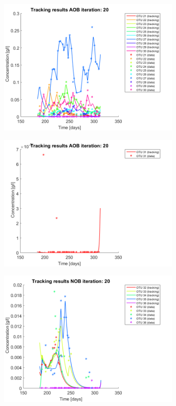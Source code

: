 \documentclass[3p,times]{article}
\begin{document}
\begin{figure}[h]
\begin{subfigure}{0.45 \textwidth}
	\includegraphics[width =\textwidth]{Application//200407_iter_20_AOB_plot_3}
	\end{subfigure}
	\begin{subfigure}{0.45 \textwidth}
	\includegraphics[width =\textwidth]{Application//200407_iter_20_AOB_plot_4}
	\end{subfigure}
	\begin{subfigure}{0.45 \textwidth}
	\includegraphics[width =\textwidth]{Application//200407_iter_20_NOB_plot_1}

\end{subfigure}
\end{figure}
\end{document}
